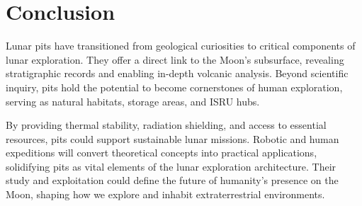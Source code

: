 \graphicspath{{img/ch7}}

\section{Conclusion}
Lunar pits have transitioned from geological curiosities to critical components of lunar exploration. They offer a direct link to the Moon's subsurface, revealing stratigraphic records and enabling in-depth volcanic analysis. Beyond scientific inquiry, pits hold the potential to become cornerstones of human exploration, serving as natural habitats, storage areas, and ISRU hubs. 

By providing thermal stability, radiation shielding, and access to essential resources, pits could support sustainable lunar missions. Robotic and human expeditions will convert theoretical concepts into practical applications, solidifying pits as vital elements of the lunar exploration architecture. Their study and exploitation could define the future of humanity's presence on the Moon, shaping how we explore and inhabit extraterrestrial environments.
